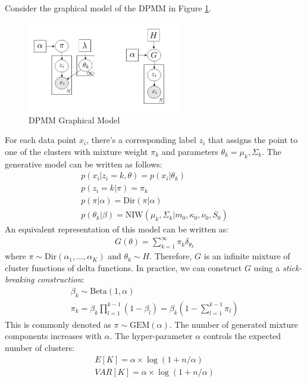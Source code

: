 Consider the graphical model of the DPMM in Figure \ref{fig:dpmm_gm}.
\begin{figure}[thpb]
    \centering
    \includegraphics[width=0.6\textwidth, trim={10 10 10 10}]{figures/dpmm_gm.png}
    \caption{DPMM Graphical Model}
    \label{fig:dpmm_gm}
\end{figure}
For each data point $x_i$, there's a corresponding label $z_i$ that assigns the point to one of the clusters with mixture weight $\pi_k$ and parameters $\theta_k = {\mu_k, \Sigma_k}$. The generative model can be written as follows:
\begin{eqnarray}
    p(x_i|z_i=k,\theta) = p(x_i|\theta_k) \\
    p(z_i=k|\pi) = \pi_k \\
    p(\pi|\alpha) = \mathrm{Dir}(\pi|\alpha) \\
    p(\theta_k|\beta) = \mathrm{NIW}(\mu_k,\Sigma_k|m_0,\kappa_0,\nu_0,S_0)
\end{eqnarray}
An equivalent representation of this model can be written as:
\begin{eqnarray}
    G(\theta) = \sum_{k=1}^{\infty}\pi_k \delta_{\theta_k}
\end{eqnarray}
where $\pi \sim \mathrm{Dir}(\alpha_1,...,\alpha_K)$ and $\theta_k \sim H$. Therefore, $G$ is an infinite mixture of cluster functions of delta functions. In practice, we can construct $G$ using a \textit{stick-breaking construction}:
\begin{eqnarray}
    \beta_k \sim \mathrm{Beta}(1,\alpha)\\
    \pi_k = \beta_k \prod_{l=1}^{k-1}(1-\beta_l) = \beta_k(1-\sum_{l=1}^{k-1}\pi_l)
\end{eqnarray}
This is commonly denoted as $\pi \sim \mathrm{GEM}(\alpha)$. The number of generated mixture components increases with $\alpha$. The hyper-parameter $\alpha$ controls the expected number of clusters:
\begin{eqnarray}
    E[K] = \alpha \times \log(1+n/\alpha)\\
    VAR[K] = \alpha \times \log(1+n/\alpha)
\end{eqnarray}
